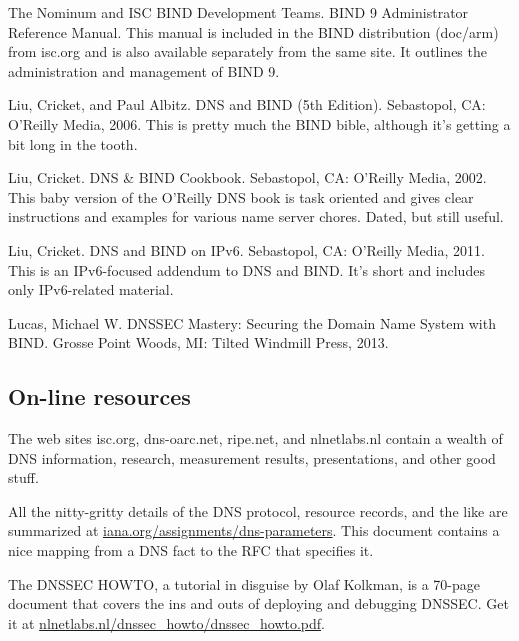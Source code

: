 {The Nominum and ISC BIND Development Teams}. {BIND 9 Administrator
Reference Manual.} This manual is included in the BIND distribution
({doc/arm}) from isc.org and is also available separately from the same
site. It outlines the administration and management of BIND 9.

{Liu, Cricket, and Paul Albitz}. {DNS and BIND (5th Edition).}
Sebastopol, CA: O'Reilly Media, 2006. This is pretty much the BIND
bible, although it's getting a bit long in the tooth.

{Liu, Cricket. }{DNS \& BIND Cookbook}. Sebastopol, CA: O'Reilly Media,
2002. This baby version of the O'Reilly DNS book is task oriented and
gives clear instructions and examples for various name server chores.
Dated, but still useful.

{Liu, Cricket}. {DNS and BIND on IPv6. }Sebastopol, CA: O'Reilly Media,
2011. This is an IPv6-focused addendum to DNS and BIND. It's short and
includes only IPv6-related material.

{Lucas, Michael W. }{DNSSEC Mastery: Securing the Domain Name System
with BIND}. Grosse Point Woods, MI: Tilted Windmill Press, 2013.

\protect\hypertarget{part0024_split_075.html}{}{}

\hypertarget{part0024_split_075.htmlux5cux23_idContainer1069}{}
\hypertarget{part0024_split_075.htmlux5cux23calibre_pb_74}{%
\subsection[On-line
resources]{\texorpdfstring{\protect\hypertarget{part0024_split_075.htmlux5cux23_idTextAnchor969}{}{}On-line
resources}{On-line resources}}\label{part0024_split_075.htmlux5cux23calibre_pb_74}}

The web sites isc.org, dns-oarc.net, ripe.net, and nlnetlabs.nl contain
a wealth of DNS information, research, measurement results,
presentations, and other good stuff.

All the nitty-gritty details of the DNS protocol, resource records, and
the like are summarized at
\href{http://iana.org/assignments/dns-parameters}{iana.org/assignments/dns-parameters}.
This document contains a nice mapping from a DNS fact to the RFC that
specifies it.

The {DNSSEC HOWTO}, a tutorial in disguise by Olaf Kolkman, is a 70-page
document that covers the ins and outs of deploying and debugging DNSSEC.
Get it at
\href{http://nlnetlabs.nl/dnssec_howto/dnssec_howto.pdf}{nlnetlabs.nl/dnssec\_howto/dnssec\_howto.pdf}.

